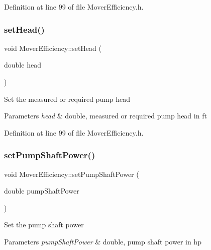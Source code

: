 Definition at line 99 of file Mover\+Efficiency.\+h.

\mbox{\label{class_mover_efficiency_a1dce269494ecdfc348c8d0a3f9d33df6}} 
\subsubsection{\texorpdfstring{set\+Head()}{setHead()}\hspace{0.1cm}{\footnotesize\ttfamily [3/3]}}
{\footnotesize\ttfamily void Mover\+Efficiency\+::set\+Head (\begin{DoxyParamCaption}\item[{double}]{head }\end{DoxyParamCaption})\hspace{0.3cm}{\ttfamily [inline]}}

Set the measured or required pump head 
\begin{DoxyParams}{Parameters}
{\em head} & double, measured or required pump head in ft \\
\hline
\end{DoxyParams}


Definition at line 99 of file Mover\+Efficiency.\+h.

\mbox{\label{class_mover_efficiency_afc2fea6487106318d441a0130ed2934d}} 
\subsubsection{\texorpdfstring{set\+Pump\+Shaft\+Power()}{setPumpShaftPower()}\hspace{0.1cm}{\footnotesize\ttfamily [1/3]}}
{\footnotesize\ttfamily void Mover\+Efficiency\+::set\+Pump\+Shaft\+Power (\begin{DoxyParamCaption}\item[{double}]{pump\+Shaft\+Power }\end{DoxyParamCaption})\hspace{0.3cm}{\ttfamily [inline]}}

Set the pump shaft power 
\begin{DoxyParams}{Parameters}
{\em pump\+Shaft\+Power} & double, pump shaft power in hp \\
\hline
\end{DoxyParams}


